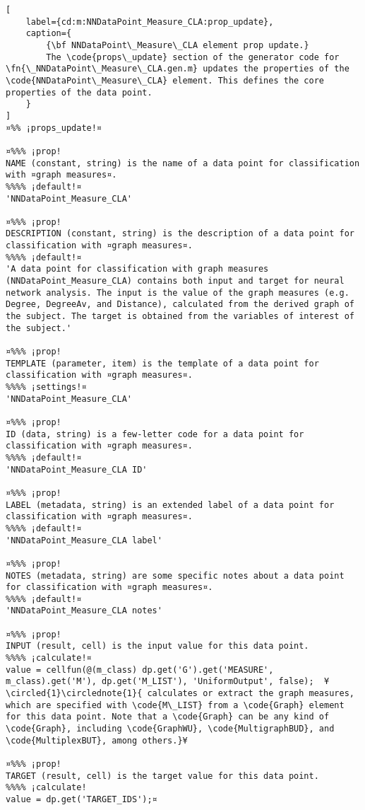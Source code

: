 \documentclass{tufte-handout}
\begin{document}
\begin{lstlisting}[
	label={cd:m:NNDataPoint_Measure_CLA:prop_update},
	caption={
		{\bf NNDataPoint\_Measure\_CLA element prop update.}
		The \code{props\_update} section of the generator code for \fn{\_NNDataPoint\_Measure\_CLA.gen.m} updates the properties of the \code{NNDataPoint\_Measure\_CLA} element. This defines the core properties of the data point.
	}
]
¤%% ¡props_update!¤

¤%%% ¡prop!
NAME (constant, string) is the name of a data point for classification with ¤graph measures¤.
%%%% ¡default!¤
'NNDataPoint_Measure_CLA'

¤%%% ¡prop!
DESCRIPTION (constant, string) is the description of a data point for classification with ¤graph measures¤.
%%%% ¡default!¤
'A data point for classification with graph measures (NNDataPoint_Measure_CLA) contains both input and target for neural network analysis. The input is the value of the graph measures (e.g. Degree, DegreeAv, and Distance), calculated from the derived graph of the subject. The target is obtained from the variables of interest of the subject.'

¤%%% ¡prop!
TEMPLATE (parameter, item) is the template of a data point for classification with ¤graph measures¤.
%%%% ¡settings!¤
'NNDataPoint_Measure_CLA'

¤%%% ¡prop!
ID (data, string) is a few-letter code for a data point for classification with ¤graph measures¤.
%%%% ¡default!¤
'NNDataPoint_Measure_CLA ID'

¤%%% ¡prop!
LABEL (metadata, string) is an extended label of a data point for classification with ¤graph measures¤.
%%%% ¡default!¤
'NNDataPoint_Measure_CLA label'

¤%%% ¡prop!
NOTES (metadata, string) are some specific notes about a data point for classification with ¤graph measures¤.
%%%% ¡default!¤
'NNDataPoint_Measure_CLA notes'

¤%%% ¡prop!
INPUT (result, cell) is the input value for this data point.
%%%% ¡calculate!¤ 
value = cellfun(@(m_class) dp.get('G').get('MEASURE', m_class).get('M'), dp.get('M_LIST'), 'UniformOutput', false);  ¥\circled{1}\circlednote{1}{ calculates or extract the graph measures, which are specified with \code{M\_LIST} from a \code{Graph} element for this data point. Note that a \code{Graph} can be any kind of \code{Graph}, including \code{GraphWU}, \code{MultigraphBUD}, and \code{MultiplexBUT}, among others.}¥
    
¤%%% ¡prop!
TARGET (result, cell) is the target value for this data point.
%%%% ¡calculate!
value = dp.get('TARGET_IDS');¤

\end{lstlisting}
\end{document}
